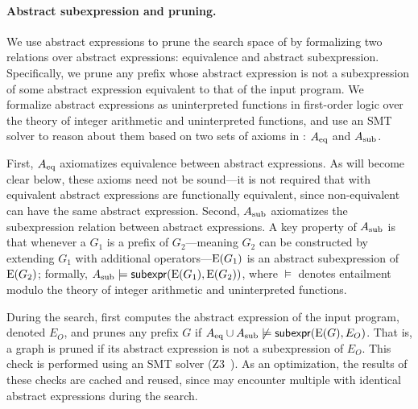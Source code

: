 \paragraph{Abstract subexpression and pruning.}
We use abstract expressions to prune the search space of \graphs by formalizing two relations over abstract expressions: equivalence and abstract subexpression. Specifically, we prune any \graph prefix whose abstract expression is not a subexpression of some abstract expression equivalent to that of the input program.
%
We formalize abstract expressions as uninterpreted functions in first-order logic over the theory of integer arithmetic and uninterpreted functions,
and use an SMT solver to reason about them based on two sets of axioms in : $A_\text{eq}$ and $A_\text{sub}$.

First, $A_\text{eq}$ axiomatizes equivalence between abstract expressions.
As will become clear below, these axioms need not be sound---it is not required that \graphs with equivalent abstract expressions are functionally equivalent, since non-equivalent \graphs can have the same abstract expression.
Second, $A_\text{sub}$ axiomatizes the subexpression relation between abstract expressions. A key property of $A_\text{sub}$ is that whenever a \graph $G_1$ is a prefix of $G_2$---meaning $G_2$ can be constructed by extending $G_1$ with additional operators---$\mathrm{E}(G_1)$ is an abstract subexpression of $\mathrm{E}(G_2)$; formally, $A_\text{sub} \models \mathsf{subexpr}(\mathrm{E}(G_1), \mathrm{E}(G_2))$, where $\models$ denotes entailment modulo the theory of integer arithmetic and uninterpreted functions.

During the search,  first computes the abstract expression of the input \lax program, denoted $E_O$, and prunes any \graph prefix $G$ if $A_\text{eq} \cup A_\text{sub} \not\models \mathsf{subexpr}(\mathrm{E}(G),E_O)$. That is, a graph is pruned if its abstract expression is not a subexpression of $E_O$. This check is performed using an SMT solver (Z3~\cite{z3}).
As an optimization, the results of these checks are cached and reused, since \sys may encounter multiple \graphs with identical abstract expressions during the search.

